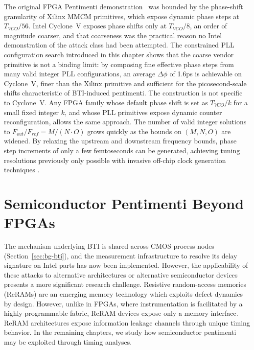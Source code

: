 The original FPGA Pentimenti demonstration~\cite{drewes2024pentimento}
was bounded by the phase-shift granularity of Xilinx MMCM primitives,
which expose dynamic phase steps at $T_{VCO}/56$. Intel Cyclone~V
exposes phase shifts only at $T_{VCO}/8$, an order of magnitude coarser,
and that coarseness was the practical reason no Intel demonstration of
the attack class had been attempted. The constrained PLL configuration
search introduced in this chapter shows that the coarse vendor primitive
is not a binding limit: by composing fine effective phase steps from
many valid integer PLL configurations, an average $\Delta \phi$ of 1.6ps
is achievable on Cyclone~V, finer than the Xilinx primitive and
sufficient for the picosecond-scale shifts characteristic of BTI-induced
pentimenti. The construction is not specific to Cyclone~V. Any FPGA
family whose default phase shift is set as $T_{VCO}/k$ for a small fixed
integer $k$, and whose PLL primitives expose dynamic counter
reconfiguration, allows the same approach. The number of valid integer
solutions to $F_{out}/F_{ref} = M/(N \cdot O)$ grows quickly as the
bounds on $(M, N, O)$ are widened. By relaxing the upstream and
downstream frequency bounds, phase step increments of only a few
femtoseconds can be generated, achieving tuning resolutions previously
only possible with invasive off-chip clock generation techniques
\cite{zick2015gaining}.

\section{Semiconductor Pentimenti Beyond FPGAs}
\label{sec:fpga-pentimenti-implications}

The mechanism underlying BTI is shared across CMOS process nodes
(Section~\ref{sec:bg-bti}), and the measurement infrastructure to
resolve its delay signature on Intel parts has now been implemented.
However, the applicability of these attacks to alternative architectures
or alternative semiconductor devices presents a more significant
research challenge. Resistive random-access memories (ReRAMs) are an
emerging memory technology which exploits defect dynamics by design.
However, unlike in FPGAs, where instrumentation is facilitated by a
highly programmable fabric, ReRAM devices expose only a memory
interface. ReRAM architectures expose information leakage channels
through unique timing behavior. In the remaining chapters, we study how
semiconductor pentimenti may be exploited through timing analyses.